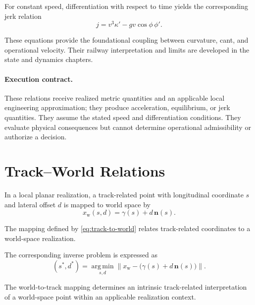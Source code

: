 For constant speed, differentiation with respect to time yields the
corresponding jerk relation
\begin{equation}
j
=
v^3\kappa'
-gv\cos\phi\,\phi'.
\label{eq:jerk-relation}
\end{equation}

These equations provide the foundational coupling between curvature,
cant, and operational velocity. Their railway interpretation and limits
are developed in the state and dynamics chapters.

\paragraph{Execution contract.}
These relations receive realized metric quantities and an applicable
local engineering approximation; they produce acceleration, equilibrium,
or jerk quantities. They assume the stated speed and differentiation
conditions. They evaluate physical consequences but cannot determine
operational admissibility or authorize a decision.

\section{Track--World Relations}

In a local planar realization, a track-related point with longitudinal
coordinate \(s\) and lateral offset \(d\) is mapped to world space by
\begin{equation}
x_{\mathrm w}(s,d)
=
\gamma(s)+d\,\mathbf n(s).
\label{eq:track-to-world}
\end{equation}

\begin{definition}
\label{def:track-to-world}
The mapping defined by \cref{eq:track-to-world} relates track-related
coordinates to a world-space realization.
\end{definition}

The corresponding inverse problem is expressed as
\begin{equation}
(s^\ast,d^\ast)
=
\operatorname*{arg\,min}_{s,d}
\left\|
x_{\mathrm w}-\bigl(\gamma(s)+d\,\mathbf n(s)\bigr)
\right\|.
\label{eq:world-to-track}
\end{equation}

\begin{definition}
\label{def:world-to-track}
The world-to-track mapping determines an intrinsic track-related
interpretation of a world-space point within an applicable realization
context.
\end{definition}

